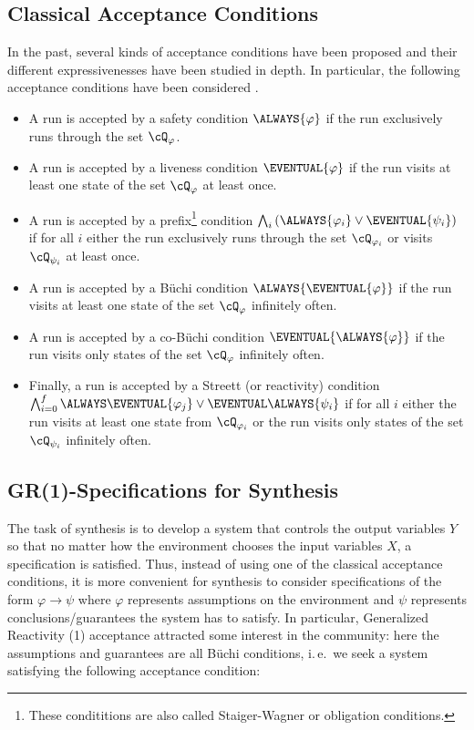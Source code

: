\documentclass[submission,copyright,creativecommons]{eptcs}
\newcommand{\ie}{i.\,e.~}
\begin{document}
\subsection{Classical Acceptance Conditions}

In the past, several kinds of acceptance conditions have been proposed and their different expressivenesses have been studied in depth. In particular, the following acceptance conditions have been considered \cite{Wagn79,Thom90a,Schn03}.

\begin{itemize}
\item A run is accepted by a safety condition $\ALWAYS{\varphi}$ if the run exclusively runs through the set $\cQ_\varphi$.
\item A run is accepted by a liveness condition $\EVENTUAL{\varphi}$ if the run visits at least one state of the set $\cQ_\varphi$ at least once.
\item A run is accepted by a prefix\footnote{These condititions are also called Staiger-Wagner or obligation conditions.} condition
$\bigwedge_i \left(\ALWAYS{\varphi_i} \vee \EVENTUAL{\psi_i}\right)$  if for all $i$ either the run exclusively runs through the set $\cQ_{\varphi_i}$ or visits $\cQ_{\psi_i}$ at least once.
\item A run is accepted by a Büchi condition $\ALWAYS{\EVENTUAL{\varphi}}$  if the run visits at least one state of the set $\cQ_{\varphi}$ infinitely often.
\item A run is accepted by a co-Büchi condition $\EVENTUAL{\ALWAYS{\varphi}}$  if the run visits only states of the set $\cQ_\varphi$ infinitely often.
\item Finally, a run is accepted by a Streett (or reactivity) condition $\bigwedge_{i=0}^{f}\ALWAYS\EVENTUAL{\varphi_j}\vee \EVENTUAL\ALWAYS{\psi_i}$ if for all $i$ either the run visits at least one state from $\cQ_{\varphi_i}$ or the run visits only states of the set $\cQ_{\psi_i}$ infinitely often. 
\end{itemize}












\subsection{GR(1)-Specifications for \texorpdfstring{\LTL{}}{LTL} Synthesis }
The task of \LTL{} synthesis is to develop a system that controls the output variables $Y$ so that no matter how the environment chooses the input variables $X$, a \LTL{} specification is satisfied. Thus, instead of using one of the classical acceptance conditions, it is more convenient for synthesis to consider specifications of the form $\varphi \rightarrow \psi$ where $\varphi$ represents assumptions on the environment and $\psi$ represents conclusions/guarantees the system has to satisfy. In particular, Generalized Reactivity (1) acceptance \cite{BGJP07,BGJP07a,JGWB07,PiPS06} attracted some interest in the community: here the assumptions and guarantees are all Büchi conditions, \ie we seek a system satisfying the following
acceptance condition:
\end{document}

